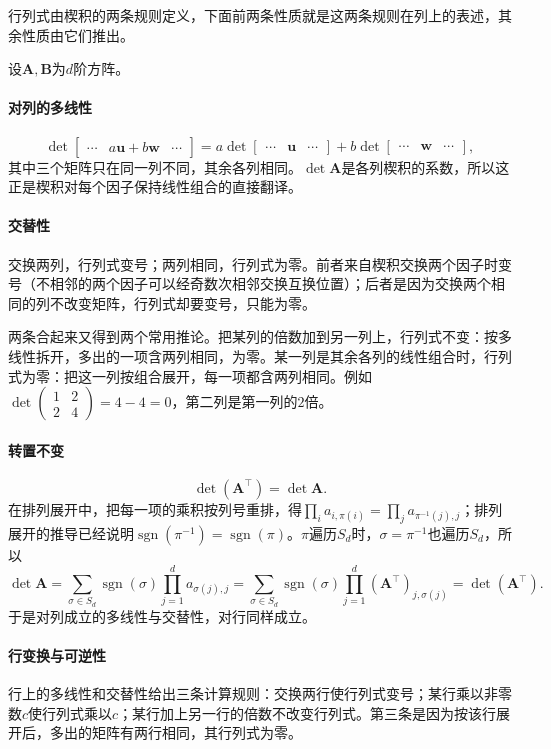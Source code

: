 行列式由楔积的两条规则定义，下面前两条性质就是这两条规则在列上的表述，其余性质由它们推出。

设$\bm A,\bm B$为$d$阶方阵。

\paragraph{对列的多线性}
\[
 \det\begin{bmatrix}\cdots&a\bm u+b\bm w&\cdots\end{bmatrix}
 =a\det\begin{bmatrix}\cdots&\bm u&\cdots\end{bmatrix}
 +b\det\begin{bmatrix}\cdots&\bm w&\cdots\end{bmatrix},
\]
其中三个矩阵只在同一列不同，其余各列相同。$\det\bm A$是各列楔积的系数，所以这正是楔积对每个因子保持线性组合的直接翻译。

\paragraph{交替性}
交换两列，行列式变号；两列相同，行列式为零。前者来自楔积交换两个因子时变号（不相邻的两个因子可以经奇数次相邻交换互换位置）；后者是因为交换两个相同的列不改变矩阵，行列式却要变号，只能为零。

两条合起来又得到两个常用推论。把某列的倍数加到另一列上，行列式不变：按多线性拆开，多出的一项含两列相同，为零。某一列是其余各列的线性组合时，行列式为零：把这一列按组合展开，每一项都含两列相同。例如$\det\left(\begin{smallmatrix}1&2\\2&4\end{smallmatrix}\right)=4-4=0$，第二列是第一列的$2$倍。

\paragraph{转置不变}
\[
 \det(\bm A^\top)=\det\bm A.
\]
在排列展开中，把每一项的乘积按列号重排，得$\prod_ia_{i,\pi(i)}=\prod_ja_{\pi^{-1}(j),j}$；排列展开的推导已经说明$\operatorname{sgn}(\pi^{-1})=\operatorname{sgn}(\pi)$。$\pi$遍历$S_d$时，$\sigma=\pi^{-1}$也遍历$S_d$，所以
\[
 \det\bm A=\sum_{\sigma\in S_d}\operatorname{sgn}(\sigma)\prod_{j=1}^da_{\sigma(j),j}
 =\sum_{\sigma\in S_d}\operatorname{sgn}(\sigma)\prod_{j=1}^d(\bm A^\top)_{j,\sigma(j)}
 =\det(\bm A^\top).
\]
于是对列成立的多线性与交替性，对行同样成立。

\paragraph{行变换与可逆性}
行上的多线性和交替性给出三条计算规则：交换两行使行列式变号；某行乘以非零数$c$使行列式乘以$c$；某行加上另一行的倍数不改变行列式。第三条是因为按该行展开后，多出的矩阵有两行相同，其行列式为零。

